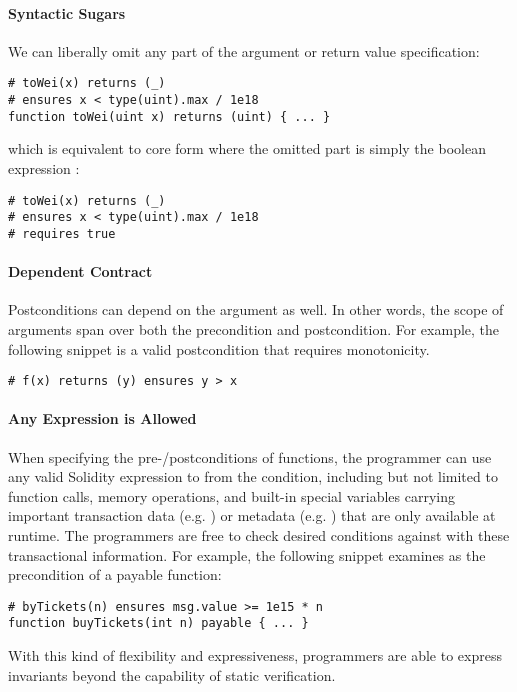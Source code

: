 \paragraph{Syntactic Sugars}
We can liberally omit any part of the argument or return value specification:
\begin{lstlisting}
# toWei(x) returns (_)
# ensures x < type(uint).max / 1e18
function toWei(uint x) returns (uint) { ... }
\end{lstlisting}
which is equivalent to core form where the omitted part is simply the boolean expression
:
\begin{lstlisting}[language=Solidity]
# toWei(x) returns (_)
# ensures x < type(uint).max / 1e18
# requires true
\end{lstlisting}

\paragraph{Dependent Contract}
Postconditions can depend on the argument as well. In other words,
the scope of arguments span over both the precondition and postcondition.
For example, the following snippet is a valid postcondition that requires
monotonicity.
\begin{lstlisting}
# f(x) returns (y) ensures y > x
\end{lstlisting}


\paragraph{Any Expression is Allowed}
When specifying the pre-/postconditions of functions, the programmer can use
any valid Solidity expression to from the condition, including but not limited
to function calls, memory operations, and built-in special variables carrying
important transaction data (e.g. ) or metadata (e.g.
) that are only available at runtime.
The programmers are free to check desired conditions against with these
transactional information.
For example, the following snippet examines  as the
precondition of a payable function:
\begin{lstlisting}
# byTickets(n) ensures msg.value >= 1e15 * n
function buyTickets(int n) payable { ... }
\end{lstlisting}
With this kind of flexibility and expressiveness, programmers are able to
express invariants beyond the capability of static verification.

